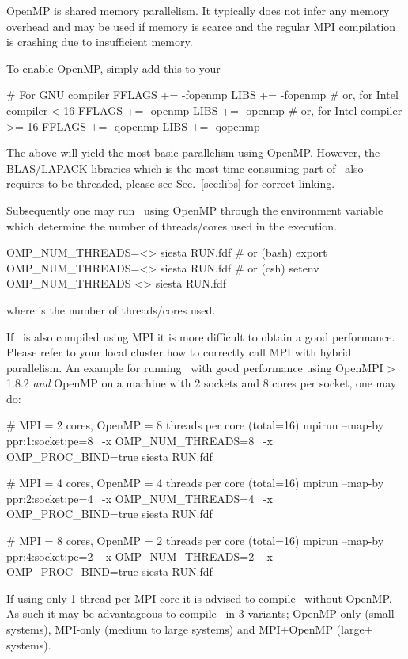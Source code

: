 OpenMP is shared memory parallelism. It typically does not infer any
memory overhead and may be used if memory is scarce and the regular
MPI compilation is crashing due to insufficient memory.

To enable OpenMP, simply add this to your 
\begin{shellexample}
  # For GNU compiler
  FFLAGS += -fopenmp
  LIBS += -fopenmp
  # or, for Intel compiler < 16
  FFLAGS += -openmp
  LIBS += -openmp
  # or, for Intel compiler >= 16
  FFLAGS += -qopenmp
  LIBS += -qopenmp
\end{shellexample}
The above will yield the most basic parallelism using OpenMP. However,
the BLAS/LAPACK libraries which is the most time-consuming part of
\siesta\ also requires to be threaded, please see Sec.~\ref{sec:libs}
for correct linking.

Subsequently one may run \siesta\ using OpenMP through the environment
variable  which determine the number of
threads/cores used in the execution.
\begin{shellexample}
  OMP_NUM_THREADS=<> siesta RUN.fdf
  # or (bash)
  export OMP_NUM_THREADS=<>
  siesta RUN.fdf
  # or (csh)
  setenv OMP_NUM_THREADS <>
  siesta RUN.fdf
\end{shellexample}
where \shell{<>} is the number of threads/cores used.

If \siesta\ is also compiled using MPI it is more difficult to obtain
a good performance. Please refer to your local cluster how to
correctly call MPI with hybrid parallelism.
%
An example for running \siesta\ with good performance using OpenMPI >
1.8.2 \emph{and} OpenMP on a machine with 2 sockets and 8 cores per
socket, one may do:
\begin{shellexample}
  # MPI = 2 cores, OpenMP = 8 threads per core (total=16)
  mpirun --map-by ppr:1:socket:pe=8 \
     -x OMP_NUM_THREADS=8 \
     -x OMP_PROC_BIND=true siesta RUN.fdf

  # MPI = 4 cores, OpenMP = 4 threads per core (total=16)
  mpirun --map-by ppr:2:socket:pe=4 \
     -x OMP_NUM_THREADS=4 \
     -x OMP_PROC_BIND=true siesta RUN.fdf

  # MPI = 8 cores, OpenMP = 2 threads per core (total=16)
  mpirun --map-by ppr:4:socket:pe=2 \
     -x OMP_NUM_THREADS=2 \
     -x OMP_PROC_BIND=true siesta RUN.fdf
\end{shellexample}
If using only 1 thread per MPI core it is advised to compile \siesta\
without OpenMP. As such it may be advantageous to compile \siesta\ in
3 variants; OpenMP-only (small systems), MPI-only (medium to large
systems) and MPI$+$OpenMP (large$+$ systems).


